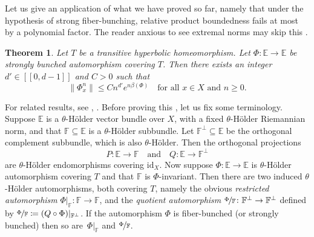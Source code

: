 \documentclass[10pt]{amsart}
\newcommand{\ldbrack}{[\![}
\newcommand{\rdbrack}{]\!]}
\def\vcentcolon{\mathrel{\mathop\ordinarycolon}}
\providecommand\ordinarycolon{:}
\providecommand*\coloneqq{\vcentcolon\mathrel{\mkern-1.2mu}=}
\theoremstyle{plain}
\newtheorem{theorem}{Theorem}[section]
\theoremstyle{definition}
\newcommand{\EE}{\mathbb{E}}
\newcommand{\FF}{\mathbb{F}}
\newcommand{\id}{\mathrm{id}}
\begin{document}
Let us give an application of what we have proved so far, namely that under the hypothesis of strong fiber-bunching, relative product boundedness fails at most by a polynomial factor.
The reader anxious to see extremal norms may skip this .

\begin{theorem}\label{t.polynomial}
Let $T$ be a transitive hyperbolic homeomorphism.
Let $\Phi \colon \EE \to \EE$ be strongly bunched automorphism covering $T$.
Then there exists an integer $d' \in \ldbrack 0, d-1 \rdbrack$ and $C>0$ such that
\[
\|\Phi_x^n\| \le C n^{d'} e^{n \beta(\Phi)} \quad \text{for all $x\in X$ and $n \ge 0$.}
\]
\end{theorem}

For related results, see \cite[Th.\,3.10]{KalSad}, \cite[\S3.5--3.6]{Jungers}. Before proving this , let us fix some terminology.
Suppose $\EE$ is a $\theta$-Hölder vector bundle over $X$, with a fixed $\theta$-Hölder Riemannian norm,
and that $\FF \subseteq \EE$ is a $\theta$-Hölder subbundle.
Let $\FF^\perp \subseteq \EE$ be the orthogonal complement subbundle, which is also $\theta$-Hölder.
Then the orthogonal projections
\begin{equation}\label{e.projections}
P \colon \EE \to \FF \quad \text{and} \quad Q \colon \EE \to \FF^\perp
\end{equation}
are $\theta$-Hölder endomorphisms covering $\id_X$.
Now suppose $\Phi \colon \EE \to \EE$ is $\theta$-Hölder automorphism covering $T$ and that $\FF$ is $\Phi$-invariant.
Then there are two induced $\theta$-Hölder automorphisms, both covering $T$, namely the obvious \emph{restricted automorphism} $\Phi|_\FF \colon \FF \to \FF$, and the \emph{quotient automorphism} $\nicefrac{\Phi}{\FF} \colon \FF^\perp \to \FF^\perp$ defined by $\nicefrac{\Phi}{\FF} \coloneqq (Q \circ \Phi )|_{\FF^\perp}$.
If the automorphism $\Phi$ is fiber-bunched (or strongly bunched) then so are~$\Phi|_\FF$ and $\nicefrac{\Phi}{\FF}$.
\end{document}
